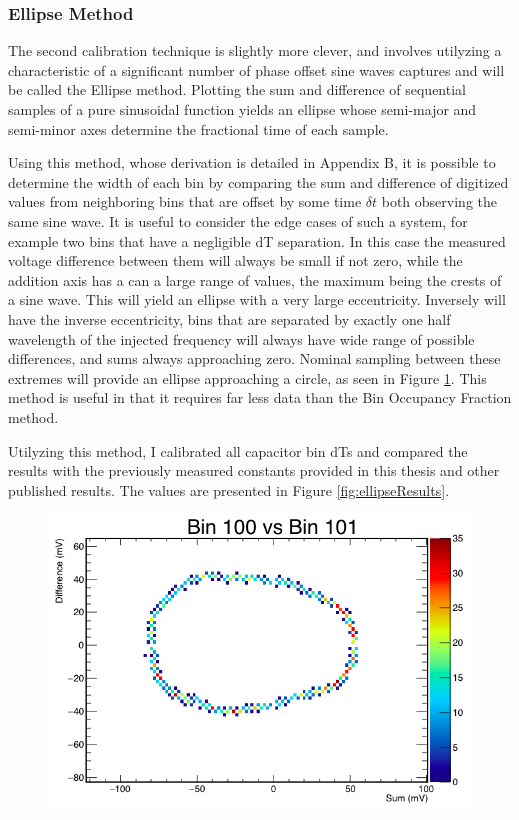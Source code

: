 		
		
		

	\subsubsection{Ellipse Method}	
		The second calibration technique is slightly more clever, and involves utilyzing a characteristic of a significant number of phase offset sine waves captures and will be called the Ellipse method.  Plotting the sum and difference of sequential samples of a pure sinusoidal function yields an ellipse whose semi-major and semi-minor axes determine the fractional time of each sample.  
		
		Using this method, whose derivation is detailed in Appendix B, it is possible to determine the width of each bin by comparing the sum and difference of digitized values from neighboring bins that are offset by some time $\delta t$ both observing the same sine wave.  It is useful to consider the edge cases of such a system, for example two bins that have a negligible dT separation.  In this case the measured voltage difference between them will always be small if not zero, while the addition axis has a can a large range of values, the maximum being the crests of a sine wave. This will yield an ellipse with a very large eccentricity.  Inversely will have the inverse eccentricity, bins that are separated by exactly one half wavelength of the injected frequency will always have wide range of possible differences, and sums always approaching zero.  Nominal sampling between these extremes will provide an ellipse approaching a circle, as seen in Figure \ref{fig:ellipseMethodExample}.  This method is useful in that it requires far less data than the Bin Occupancy Fraction method.  
		
		Utilyzing this method, I calibrated all capacitor bin dTs and compared the results with the previously measured constants provided in this thesis and other published results\cite{benSThesis}.  The values are presented in Figure \ref{fig:ellipseResults}.
		
	\begin{figure}
		\includegraphics[width=\textwidth]{figures/ellipseMethodExample}
		\caption{}
		\label{fig:ellipseMethodExample}
	\end{figure}

